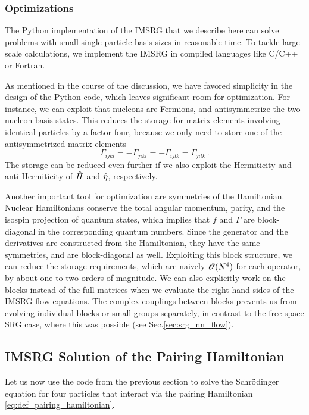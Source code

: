 {\subsubsection*{Optimizations}
The Python implementation of the IMSRG that we describe here can solve
problems with small single-particle basis sizes in reasonable time. To 
tackle large-scale calculations, we implement the IMSRG in compiled
languages like C/C++ or Fortran.

As mentioned in the course of the discussion, we have favored simplicity 
in the design of the Python code, which leaves significant room for optimization.
For instance, we can exploit that nucleons are Fermions, and 
antisymmetrize the two-nucleon basis states. This reduces the storage for
matrix elements involving identical particles by a factor four, because
we only need to store one of the antisymmetrized matrix elements 
\begin{equation}
  \Gamma_{ijkl} = -\Gamma_{jikl} = - \Gamma_{ijlk} = \Gamma_{jilk}\,.
\end{equation}
The storage can be reduced even further if we also exploit the Hermiticity
and anti-Hermiticity of $\hat{H}$ and $\hat{\eta}$, respectively.

Another important tool for optimization are symmetries of the Hamiltonian.
Nuclear Hamiltonians conserve the total angular momentum, parity, and the 
isospin projection of quantum states, which implies that $f$ and $\Gamma$ 
are block-diagonal in the corresponding quantum numbers. Since the generator 
and the derivatives are constructed from the Hamiltonian, they have the
same symmetries, and are block-diagonal as well. Exploiting this block
structure, we can reduce the storage requirements, which are naively $\mathcal{O}(N^4)$
for each operator, by about one to two orders of magnitude. We can 
also explicitly work on the blocks instead of the full matrices when 
we evaluate the right-hand sides of the IMSRG flow equations.  The complex 
couplings between blocks prevents us from evolving individual blocks or
small groups separately, in contrast to the free-space SRG case, where
this was possible (see Sec.\ref{sec:srg_nn_flow}). 



\subsection{\label{sec:imsrg_pairing}IMSRG Solution of the Pairing Hamiltonian}
Let us now use the code from the previous section to solve the 
Schr\"odinger equation for four particles that interact via the pairing
Hamiltonian \eqref{eq:def_pairing_hamiltonian}.

}
